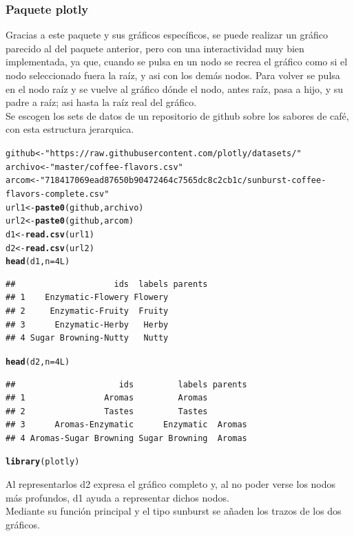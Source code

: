 \documentclass{article}\usepackage[]{graphicx}\usepackage[]{color}
\makeatletter
\newcommand{\hlnum}[1]{\textcolor[rgb]{0.686,0.059,0.569}{#1}}%
\newcommand{\hlstr}[1]{\textcolor[rgb]{0.192,0.494,0.8}{#1}}%
\newcommand{\hlstd}[1]{\textcolor[rgb]{0.345,0.345,0.345}{#1}}%
\newcommand{\hlkwb}[1]{\textcolor[rgb]{0.69,0.353,0.396}{#1}}%
\newcommand{\hlkwc}[1]{\textcolor[rgb]{0.333,0.667,0.333}{#1}}%
\newcommand{\hlkwd}[1]{\textcolor[rgb]{0.737,0.353,0.396}{\textbf{#1}}}%
\newenvironment{kframe}{%
 \def\at@end@of@kframe{}%
 \ifinner\ifhmode%
  \def\at@end@of@kframe{\end{minipage}}%
  \begin{minipage}{\columnwidth}%
 \fi\fi%
 \def\FrameCommand##1{\hskip\@totalleftmargin \hskip-\fboxsep
 \colorbox{shadecolor}{##1}\hskip-\fboxsep
     \hskip-\linewidth \hskip-\@totalleftmargin \hskip\columnwidth}%
 \MakeFramed {\advance\hsize-\width
   \@totalleftmargin\z@ \linewidth\hsize
   \@setminipage}}%
 {\par\unskip\endMakeFramed%
 \at@end@of@kframe}
\newenvironment{knitrout}{}{} %
\makeatother
\begin{document}
\subsubsection{Paquete plotly}
Gracias a este paquete \cite{docu_plotly}
y sus gr\'aficos espec\'ificos, se puede realizar un gr\'afico parecido al del paquete anterior, pero con una interactividad muy bien implementada, ya que, cuando se pulsa en un nodo se recrea el gr\'afico como si el nodo seleccionado fuera la ra\'iz, y asi con los dem\'as nodos. Para volver se pulsa en el nodo ra\'iz y se vuelve al gr\'afico d\'onde el nodo, antes ra\'iz, pasa a hijo, y su padre a ra\'iz; asi hasta la ra\'iz real del gr\'afico.~\\
Se escogen los sets de datos de un repositorio de github sobre los sabores de caf\'e, con esta estructura jerarquica.
\begin{knitrout}
\color{fgcolor}\begin{kframe}
\begin{alltt}
\hlstd{github} \hlkwb{<-} \hlstr{"https://raw.githubusercontent.com/plotly/datasets/"}
\hlstd{archivo} \hlkwb{<-} \hlstr{"master/coffee-flavors.csv"}
\hlstd{arcom} \hlkwb{<-} \hlstr{"718417069ead87650b90472464c7565dc8c2cb1c/sunburst-coffee-flavors-complete.csv"}
\hlstd{url1} \hlkwb{<-} \hlkwd{paste0}\hlstd{(github, archivo)}
\hlstd{url2} \hlkwb{<-} \hlkwd{paste0}\hlstd{(github, arcom)}
\hlstd{d1} \hlkwb{<-} \hlkwd{read.csv}\hlstd{(url1)}
\hlstd{d2} \hlkwb{<-} \hlkwd{read.csv}\hlstd{(url2)}
\hlkwd{head}\hlstd{(d1,} \hlkwc{n}\hlstd{=}\hlnum{4L}\hlstd{)}
\end{alltt}
\begin{verbatim}
##                    ids  labels parents
## 1    Enzymatic-Flowery Flowery        
## 2     Enzymatic-Fruity  Fruity        
## 3      Enzymatic-Herby   Herby        
## 4 Sugar Browning-Nutty   Nutty
\end{verbatim}
\begin{alltt}
\hlkwd{head}\hlstd{(d2,} \hlkwc{n}\hlstd{=}\hlnum{4L}\hlstd{)}
\end{alltt}
\begin{verbatim}
##                     ids         labels parents
## 1                Aromas         Aromas        
## 2                Tastes         Tastes        
## 3      Aromas-Enzymatic      Enzymatic  Aromas
## 4 Aromas-Sugar Browning Sugar Browning  Aromas
\end{verbatim}
\begin{alltt}
\hlkwd{library}\hlstd{(plotly)}
\end{alltt}
\end{kframe}
\end{knitrout}
Al representarlos d2 expresa el gr\'afico completo y, al no poder verse los nodos m\'as profundos, d1 ayuda a representar dichos nodos.~\\ Mediante su funci\'on principal y el tipo sunburst se a\~naden los trazos de los dos gr\'aficos.
\end{document}
